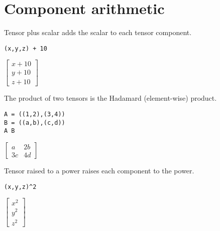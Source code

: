 \documentclass[12pt]{article}
\begin{document}
\section*{Component arithmetic}

Tensor plus scalar adds the scalar to each tensor component.

{\color{blue}
\begin{verbatim}
(x,y,z) + 10
\end{verbatim}}

$\displaystyle
\begin{bmatrix}
x+10
\\[1ex]
y+10
\\[1ex]
z+10
\end{bmatrix}
$

\bigskip
The product of two tensors is the Hadamard (element-wise) product.

{\color{blue}
\begin{verbatim}
A = ((1,2),(3,4))
B = ((a,b),(c,d))
A B
\end{verbatim}}

$\displaystyle
\begin{bmatrix}
a & 2b
\\[1ex]
3c & 4d
\end{bmatrix}
$

\bigskip

Tensor raised to a power raises each component to the power.

{\color{blue}
\begin{verbatim}
(x,y,z)^2
\end{verbatim}}

$\displaystyle
\begin{bmatrix}
x^2
\\[1ex]
y^2
\\[1ex]
z^2
\end{bmatrix}
$
\end{document}
